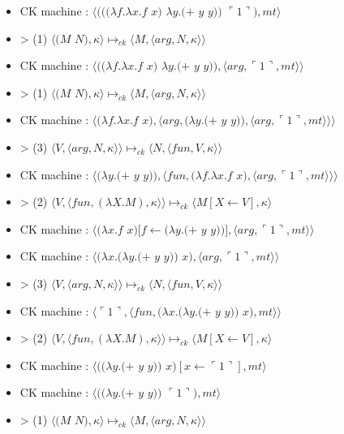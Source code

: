 \documentclass[10pt,a4paper]{article}
\begin{document}
				\begin{itemize}
					\item[] CK machine : $\langle(((\lambda f.\lambda x.f$ $x)$ $\lambda y.(+$ $y$ $y))$ $\ulcorner 1\urcorner),mt\rangle$
					\item[] > (1) $\langle(M$ $N),\kappa\rangle \longmapsto_{ck} \langle M,\langle arg,N,\kappa\rangle\rangle$
					\item[] CK machine : $\langle((\lambda f.\lambda x.f$ $x)$ $\lambda y.(+$ $y$ $y)),\langle arg,\ulcorner 1\urcorner,mt\rangle\rangle$
					\item[] > (1) $\langle(M$ $N),\kappa\rangle \longmapsto_{ck} \langle M,\langle arg,N,\kappa\rangle\rangle$
					\item[] CK machine : $\langle(\lambda f.\lambda x.f$ $x),\langle arg,(\lambda y.(+$ $y$ $y)),\langle arg,\ulcorner 1\urcorner,mt\rangle\rangle\rangle$	
					\item[] > (3) $\langle V,\langle arg,N,\kappa \rangle \rangle \longmapsto_{ck} \langle N,\langle fun,V,\kappa \rangle \rangle$
					\item[] CK machine : $\langle(\lambda y.(+$ $y$ $y)),\langle fun,(\lambda f.\lambda x.f$ $x),\langle arg,\ulcorner 1\urcorner,mt\rangle\rangle\rangle$	
					\item[] > (2) $\langle V,\langle fun,(\lambda X.M),\kappa \rangle \rangle \longmapsto_{ck} \langle M[X \leftarrow V],\kappa\rangle$
					\item[] CK machine : $\langle(\lambda x.f$ $x)[f\leftarrow(\lambda y.(+$ $y$ $y))],\langle arg,\ulcorner 1\urcorner,mt\rangle\rangle$	
					\item[] CK machine : $\langle(\lambda x.(\lambda y.(+$ $y$ $y))$ $x),\langle arg,\ulcorner 1\urcorner,mt\rangle\rangle$	
					\item[] > (3) $\langle V,\langle arg,N,\kappa \rangle \rangle \longmapsto_{ck} \langle N,\langle fun,V,\kappa \rangle \rangle$
					\item[] CK machine : $\langle\ulcorner 1\urcorner,\langle fun,(\lambda x.(\lambda y.(+$ $y$ $y))$ $x),mt\rangle\rangle$
					\item[] > (2) $\langle V,\langle fun,(\lambda X.M),\kappa \rangle \rangle \longmapsto_{ck} \langle M[X \leftarrow V],\kappa\rangle$		
					\item[] CK machine : $\langle((\lambda y.(+$ $y$ $y))$ $x)[x \leftarrow \ulcorner 1\urcorner ],mt\rangle$
					\item[] CK machine : $\langle((\lambda y.(+$ $y$ $y))$ $\ulcorner 1\urcorner),mt\rangle$
					\item[] > (1) $\langle(M$ $N),\kappa\rangle \longmapsto_{ck} \langle M,\langle arg,N,\kappa\rangle\rangle$

\end{itemize}
\end{document}
